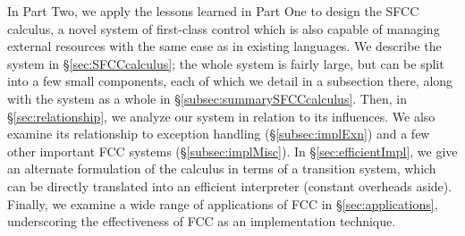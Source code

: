 \documentclass[11pt]{article}
\begin{document}
In Part Two, we apply the lessons learned in Part One to design the SFCC calculus, a novel system of first-class control which is also capable of managing external resources with the same ease as in existing languages.
We describe the system in \S\ref{sec:SFCCcalculus};
the whole system is fairly large, but can be split into a few small components, each of which we detail in a subsection there, along with the system as a whole in \S\ref{subsec:summarySFCCcalculus}.
Then, in \S\ref{sec:relationship}, we analyze our system in relation to its influences.
We also examine its relationship to exception handling (\S\ref{subsec:implExn}) and a few other important FCC systems (\S\ref{subsec:implMisc}).
In \S\ref{sec:efficientImpl}, we give an alternate formulation of the calculus in terms of a transition system, which can be directly translated into an efficient interpreter (constant overheads aside).
Finally, we examine a wide range of applications of FCC in \S\ref{sec:applications}, underscoring the effectiveness of FCC as an implementation technique.
\end{document}
